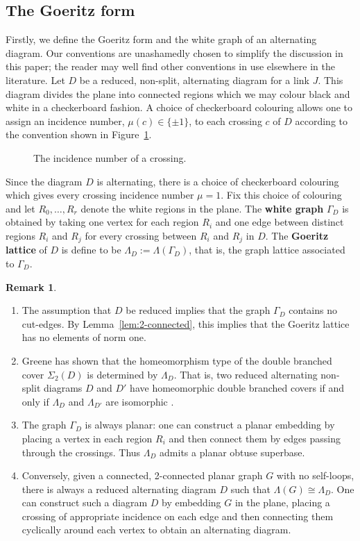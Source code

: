 \documentclass{amsart} %
\theoremstyle{thm}
\theoremstyle{definition}
\newtheorem{rem}[Theorem]{Remark}
\numberwithin{equation}{section}
\begin{document}
\subsection{The Goeritz form}
Firstly, we define the Goeritz form and the white graph of an alternating diagram. Our conventions are unashamedly chosen to simplify the discussion in this paper; the reader may well find other conventions in use elsewhere in the literature. %
Let $D$ be a reduced, non-split, alternating diagram for a link $J$. This diagram divides the plane into connected regions which we may colour black and white in a checkerboard fashion. A choice of checkerboard colouring allows one to assign an incidence number, $\mu(c)\in \{\pm 1\}$, to each crossing $c$ of $D$ according to the convention shown in Figure~\ref{fig:incidencenumber}.
  \begin{figure}[htbp] 
   \centering
   
  \caption{The incidence number of a crossing.}
  \label{fig:incidencenumber}
 \end{figure}
 Since the diagram $D$ is alternating, there is a choice of checkerboard colouring which gives every crossing incidence number $\mu=1$. Fix this choice of colouring and let $R_0, \dots, R_{r}$ denote the white regions in the plane. The \textbf{white graph} $\Gamma_D$ is obtained by taking one vertex for each region $R_i$ and one edge between distinct regions $R_i$ and $R_j$ for every crossing between $R_i$ and $R_j$ in $D$. The \textbf{Goeritz lattice} of $D$ is define to be $\Lambda_D:=\Lambda(\Gamma_D)$, that is, the graph lattice associated to $\Gamma_D$.
 
 \begin{rem}\hfill\begin{enumerate}
    \item The assumption that $D$ be reduced implies that the graph $\Gamma_D$ contains no cut-edges. By Lemma~\ref{lem:2-connected}, this implies that the Goeritz lattice has no elements of norm one.
    \item Greene has shown that the homeomorphism type of the double branched cover $\Sigma_2(D)$ is determined by $\Lambda_D$. That is, two reduced alternating non-split diagrams $D$ and $D'$ have homeomorphic double branched covers if and only if $\Lambda_D$ and $\Lambda_{D'}$ are isomorphic \cite{Gr13}.
    \item The graph $\Gamma_D$ is always planar: one can construct a planar embedding by placing a vertex in each region $R_i$ and then connect them by edges passing through the crossings. Thus $\Lambda_D$ admits a planar obtuse superbase.
    \item Conversely, given a connected, 2-connected planar graph $G$ with no self-loops, there is always a reduced alternating diagram $D$ such that $\Lambda(G)\cong \Lambda_D$. One can construct such a diagram $D$ by embedding $G$ in the plane, placing a crossing of appropriate incidence on each edge and then connecting them cyclically around each vertex to obtain an alternating diagram.
 \end{enumerate}  
 \end{rem}
 
\end{document}
